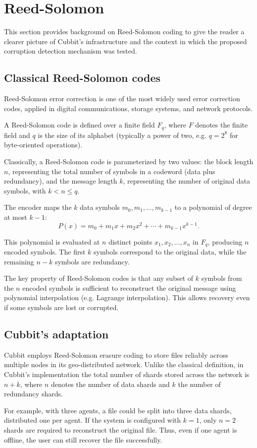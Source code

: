 \section{Reed-Solomon} \label{sec:reed-solomon}

This section provides background on Reed-Solomon coding to give the reader a clearer picture of Cubbit's infrastructure and the context in which the proposed corruption detection mechanism was tested.

\subsection{Classical Reed-Solomon codes}

Reed-Solomon error correction \cite{reed1960polynomial} is one of the most widely used error correction codes, applied in digital communications, storage systems, and network protocols.

A Reed-Solomon code is defined over a finite field $F_q$, where $F$ denotes the finite field and $q$ is the size of its alphabet (typically a power of two, e.g. $q=2^8$ for byte-oriented operations).  

Classically, a Reed-Solomon code is parameterized by two values: the block length $n$, representing the total number of symbols in a codeword (data plus redundancy), and the message length $k$, representing the number of original data symbols, with $k < n \leq q$.

The encoder maps the $k$ data symbols $m_0, m_1, \ldots, m_{k-1}$ to a polynomial of degree at most $k-1$:
\begin{equation}
P(x) = m_0 + m_1x + m_2x^2 + \cdots + m_{k-1}x^{k-1}.
\end{equation}

This polynomial is evaluated at $n$ distinct points $x_1, x_2, \ldots, x_n$ in $F_q$, producing $n$ encoded symbols. The first $k$ symbols correspond to the original data, while the remaining $n-k$ symbols are redundancy.  

The key property of Reed-Solomon codes is that any subset of $k$ symbols from the $n$ encoded symbols is sufficient to reconstruct the original message using polynomial interpolation (e.g. Lagrange interpolation). This allows recovery even if some symbols are lost or corrupted.

\subsection{Cubbit's adaptation} \label{sec:reed-solomon-in-cubbit}

Cubbit employs Reed-Solomon erasure coding to store files reliably across multiple nodes in its geo-distributed network. Unlike the classical definition, in Cubbit's implementation the total number of shards stored across the network is $n+k$, where $n$ denotes the number of data shards and $k$ the number of redundancy shards.

For example, with three agents, a file could be split into three data shards, distributed one per agent. If the system is configured with $k=1$, only $n=2$ shards are required to reconstruct the original file. Thus, even if one agent is offline, the user can still recover the file successfully.  